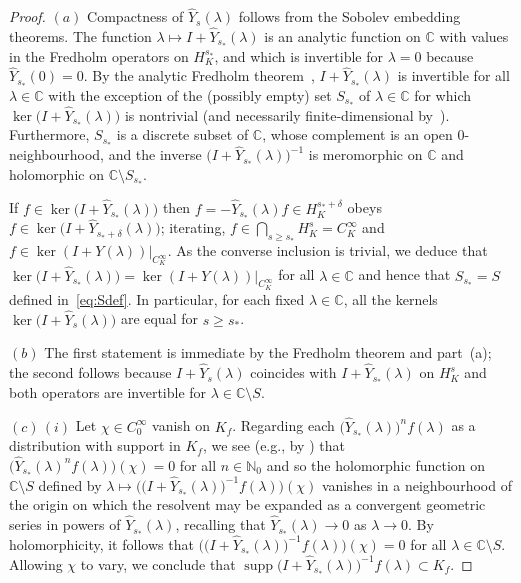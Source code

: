 \documentclass[11pt]{article}
\numberwithin{equation}{section}
\numberwithin{equation}{section}
\newcommand{\CC}{{\mathbb C}}
\newcommand{\NN}{{\mathbb N}}
\DeclareMathOperator{\supp}{supp}
\begin{document}
 \begin{proof}
 	$(a)$ Compactness of $\hat{Y}_s(\lambda)$ follows from the Sobolev embedding theorems.
 	The function $\lambda\mapsto I+ \hat{Y}_{s_*}(\lambda)$ is an analytic function on $\CC$ with values in the Fredholm operators on $H^{s_*}_K$, and which is invertible for $\lambda=0$ because $\hat{Y}_{s_*}(0)=0$. By the analytic Fredholm theorem~\cite[Theorem VI.14]{ReedSimon:vol1}, $I+ \hat{Y}_{s_*}(\lambda)$ is invertible for all $\lambda\in\CC$ with the exception of the (possibly empty) set $S_{s_*}$ of $\lambda\in \CC$ for which $\ker \big(I+ \hat{Y}_{s_*}(\lambda)\big)$ is nontrivial (and necessarily finite-dimensional by~\cite[Theorem VI.15]{ReedSimon:vol1}). Furthermore, $S_{s_*}$ is a
 	discrete subset of $\CC$, whose complement is an open $0$-neighbourhood, and the inverse $\big(I+ \hat{Y}_{s_*}(\lambda)\big)^{-1}$ is meromorphic on $\CC$ and holomorphic on $\CC\setminus S_{s_*}$.
 	
 	If $f\in\ker \big(I+\hat{Y}_{s_*}(\lambda)\big)$ then $f = - \hat{Y}_{s_*}(\lambda)f\in H^{s_*+\delta}_K$ obeys $f\in\ker \big(I+ \hat{Y}_{s_*+\delta}(\lambda)\big)$; iterating, $f\in \bigcap_{s\ge s_*} H^s_K=C^\infty_K$ and $f\in \ker (I+ Y(\lambda))|_{C^\infty_K}$.
 	As the converse inclusion is trivial, we deduce that
 	$\ker \big(I+\hat{Y}_{s_*}(\lambda)\big)= \ker (I+ Y(\lambda))|_{C^\infty_K}$
 	for all $\lambda\in \CC$ and hence that $S_{s_*}=S$ defined in~\eqref{eq:Sdef}. In particular, for each fixed $\lambda\in\CC$, all the kernels $\ker \big(I+\hat{Y}_{s}(\lambda)\big)$ are equal for $s\ge s_*$.
 	
 	$(b)$ The first statement is immediate by the Fredholm theorem and part~(a); the second follows because $I+\hat{Y}_{s}(\lambda)$ coincides with $I+ \hat{Y}_{s_*}(\lambda)$ on $H^s_K$ and both operators are invertible for $\lambda\in\CC\setminus S$.
 	
 	$(c)$\,$(i)$ Let $\chi\in C_0^\infty$ vanish on $K_f$. Regarding each $\big(\hat{Y}_{s_*}(\lambda)\big)^{n}f(\lambda)$ as a distribution with support in $K_f$, we see (e.g., by \cite[Theorem 2.3.3]{Hormander1}) that
 	$\big(\hat{Y}_{s_*}(\lambda)^{n}f(\lambda)\big)(\chi)=0$ for all $n\in \NN_0$ and so the
 	holomorphic function on $\CC\setminus S$ defined by $\lambda\mapsto \big(\big(I+\hat{Y}_{s_*}(\lambda)\big)^{-1}f(\lambda)\big)(\chi)$ vanishes in a neighbourhood of the origin on which the resolvent may be expanded as a convergent geometric series in powers of $\hat{Y}_{s_*}(\lambda)$, recalling that $\hat{Y}_{s_*}(\lambda)\to 0$ as $\lambda\to 0$.
 	By holomorphicity, it follows that
 	$\big(\big(I+\hat{Y}_{s_*}(\lambda)\big)^{-1}f(\lambda)\big)(\chi)=0$ for all $\lambda\in\CC\setminus S$.
 	Allowing $\chi$ to vary, we conclude that $\supp \big(I+\hat{Y}_{s_*}(\lambda)\big)^{-1}f(\lambda)\subset K_f$.
 	

\end{proof}
\end{document}
